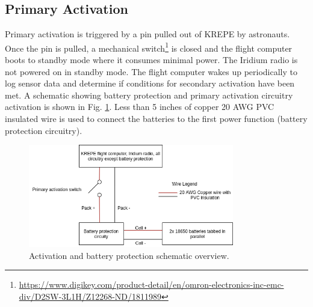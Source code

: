\documentclass{article}
\begin{document}
\subsection{Primary Activation}
\label{sec:primary-activation}
Primary activation is triggered by a pin pulled out of KREPE by astronauts. Once the pin is pulled, a mechanical switch\footnote{\url{https://www.digikey.com/product-detail/en/omron-electronics-inc-emc-div/D2SW-3L1H/Z12268-ND/1811989}} is closed and the flight computer boots to standby mode where it consumes minimal power. The Iridium radio is not powered on in standby mode. The flight computer wakes up periodically to log sensor data and determine if conditions for secondary activation have been met.  A schematic showing battery protection and primary activation circuitry activation is shown in Fig. \ref{fig:activation-circuitry}. Less than 5 inches of copper 20 AWG PVC insulated wire is used to connect the batteries to the first power function (battery protection circuitry).




\begin{figure}[H]
    \centering
    \includegraphics[width=0.8\textwidth]{images/krepe-electrical-overview.png}
    \caption{Activation and battery protection schematic overview.}
    \label{fig:activation-circuitry}
\end{figure}



\end{document}
